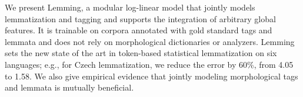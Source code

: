 We present Lemming, a modular log-linear model that jointly models lemmatization and tagging and supports the integration of arbitrary global features. It is trainable on corpora annotated with gold standard tags and lemmata and does not rely on morphological dictionaries or analyzers. Lemming sets the new state of the art in token-based statistical lemmatization on six languages; e.g., for Czech lemmatization, we reduce the error by 60\%, from 4.05 to 1.58.  We also give empirical evidence that jointly modeling morphological tags and lemmata is mutually beneficial.
